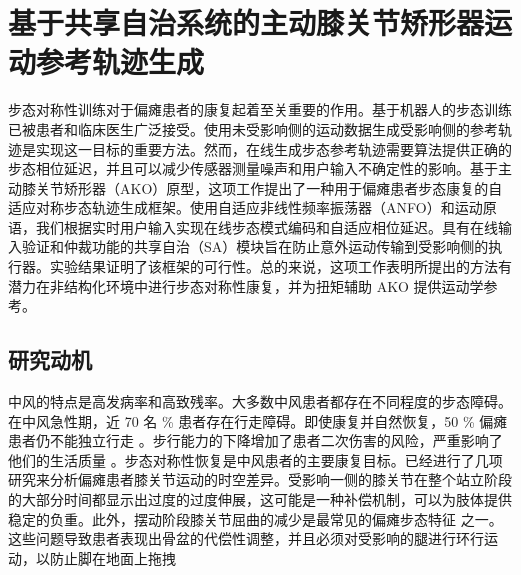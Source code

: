 \chapter{基于共享自治系统的主动膝关节矫形器运动参考轨迹生成}
步态对称性训练对于偏瘫患者的康复起着至关重要的作用。基于机器人的步态训练已被患者和临床医生广泛接受。使用未受影响侧的运动数据生成受影响侧的参考轨迹是实现这一目标的重要方法。然而，在线生成步态参考轨迹需要算法提供正确的步态相位延迟，并且可以减少传感器测量噪声和用户输入不确定性的影响。基于主动膝关节矫形器（AKO）原型，这项工作提出了一种用于偏瘫患者步态康复的自适应对称步态轨迹生成框架。使用自适应非线性频率振荡器（ANFO）和运动原语，我们根据实时用户输入实现在线步态模式编码和自适应相位延迟。具有在线输入验证和仲裁功能的共享自治（SA）模块旨在防止意外运动传输到受影响侧的执行器。实验结果证明了该框架的可行性。总的来说，这项工作表明所提出的方法有潜力在非结构化环境中进行步态对称性康复，并为扭矩辅助 AKO 提供运动学参考。

\section{研究动机}
中风的特点是高发病率和高致残率。大多数中风患者都存在不同程度的步态障碍。在中风急性期，近 70 名 \% 患者存在行走障碍。即使康复并自然恢复，50 \% 偏瘫患者仍不能独立行走    \cite{jorgensenRecoveryWalkingFunction1995}    。步行能力的下降增加了患者二次伤害的风险，严重影响了他们的生活质量    \cite{balabanGaitDisturbancesPatients2014,yelnikClinicalGuideAssess1999}    。步态对称性恢复是中风患者的主要康复目标。已经进行了几项研究来分析偏瘫患者膝关节运动的时空差异。受影响一侧的膝关节在整个站立阶段    \cite{woolleyCharacteristicsGaitHemiplegia2015}    的大部分时间都显示出过度的过度伸展，这可能是一种补偿机制，可以为肢体提供稳定的负重。此外，摆动阶段膝关节屈曲的减少是最常见的偏瘫步态特征    \cite{lucareliALTERATIONLOADRESPONSEMECHANISM2006,campaniniMethodDifferentiateCauses2013}    之一。这些问题导致患者表现出骨盆的代偿性调整，并且必须对受影响的腿进行环行运动，以防止脚在地面上拖拽    \cite{cruzBiomechanicalImpairmentsGait2009} 

